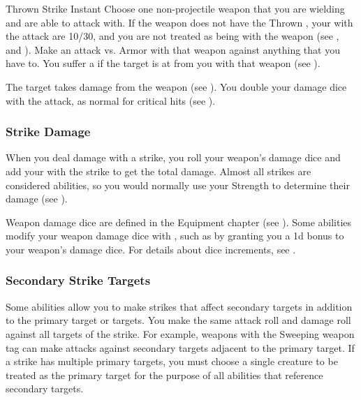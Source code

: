        \begin{activeability}{Thrown Strike}
            \label{Thrown Strike}
            Instant
            \rankline
            Choose one non-projectile weapon that you are wielding and are able to attack with.
            If the weapon does not have the Thrown , your  with the attack are 10/30, and you are not treated as being  with the weapon (see , and ).
            Make an attack vs. Armor with that weapon against anything that you have  to.
            You suffer a  if the target is at  from you with that weapon (see ).

            \hit The target takes damage from the weapon (see ).
            \crit You double your damage dice with the attack, as normal for critical hits (see ).
        \end{activeability}

        \subsubsection{Strike Damage}\label{Strike Damage}
            When you deal damage with a strike, you roll your weapon's damage dice and add your  with the strike to get the total damage.
            Almost all strikes are considered  abilities, so you would normally use your Strength to determine their damage (see ).

            Weapon damage dice are defined in the Equipment chapter (see ).
            Some abilities modify your weapon damage dice with , such as by granting you a \plus1d bonus to your weapon's damage dice.
            For details about dice increments, see .

        \subsubsection{Secondary Strike Targets}\label{Secondary Strike Targets}
            Some abilities allow you to make strikes that affect secondary targets in addition to the primary target or targets.
            You make the same attack roll and damage roll against all targets of the strike.
            For example, weapons with the Sweeping weapon tag can make attacks against secondary targets adjacent to the primary target.
            If a strike has multiple primary targets, you must choose a single creature to be treated as the primary target for the purpose of all abilities that reference secondary targets.

